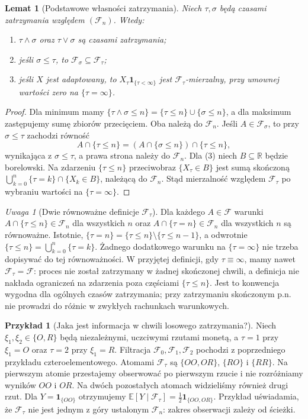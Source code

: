 \documentclass[11pt,a4paper,oneside]{report}
\numberwithin{equation}{chapter}
\theoremstyle{plain}
\newtheorem{lemat}[twierdzenie]{Lemat}
\theoremstyle{definition}
\newtheorem{przyklad}{Przykład}[chapter]
\theoremstyle{remark}
\newtheorem{uwaga}{Uwaga}[chapter]
\newcommand{\R}{\mathbb{R}}
\newcommand{\E}{\mathbb{E}}
\newcommand{\ind}[1]{\mathbf{1}_{#1}}
\begin{document}
\begin{lemat}[Podstawowe własności zatrzymania]
Niech $\tau,\sigma$ będą czasami zatrzymania
względem $(\mathcal F_n)$. Wtedy:
\begin{enumerate}
\item $\tau\wedge\sigma$ oraz $\tau\vee\sigma$ są czasami zatrzymania;
\item jeśli $\sigma\leq\tau$, to $\mathcal F_\sigma\subseteq\mathcal F_\tau$;
\item jeśli $X$ jest adaptowany, to $X_\tau\ind{\{\tau<\infty\}}$
  jest $\mathcal F_\tau$-mierzalny, przy umownej wartości zero na $\{\tau=\infty\}$.
\end{enumerate}
\end{lemat}
\begin{proof}
Dla minimum mamy
$\{\tau\wedge\sigma\leq n\}=
\{\tau\leq n\}\cup\{\sigma\leq n\}$,
a dla maksimum zastępujemy sumę zbiorów
przecięciem. Oba należą do $\mathcal F_n$.
Jeśli $A\in\mathcal F_\sigma$, to przy
$\sigma\leq\tau$ zachodzi równość
\[
A\cap\{\tau\leq n\}
=(A\cap\{\sigma\leq n\})\cap\{\tau\leq n\},
\]
wynikająca z $\sigma\leq\tau$, a prawa strona
należy do $\mathcal F_n$.
Dla (3) niech $B\subseteq\R$ będzie borelowski.
Na zdarzeniu $\{\tau\leq n\}$ przeciwobraz
$\{X_\tau\in B\}$ jest sumą skończoną
$\bigcup_{k=0}^n\{\tau=k\}\cap\{X_k\in B\}$,
należącą do $\mathcal F_n$. Stąd mierzalność
względem $\mathcal F_\tau$ po wybraniu
wartości na $\{\tau=\infty\}$.
\end{proof}

\begin{uwaga}[Dwie równoważne definicje $\mathcal F_\tau$]
Dla każdego $A\in\mathcal F$ warunki
$A\cap\{\tau\leq n\}\in\mathcal F_n$ dla wszystkich $n$
oraz $A\cap\{\tau=n\}\in\mathcal F_n$ dla wszystkich $n$
są równoważne. Istotnie, $\{\tau=n\}=\{\tau\leq n\}
\setminus\{\tau\leq n-1\}$, a odwrotnie
$\{\tau\leq n\}=\bigcup_{k=0}^n\{\tau=k\}$.
Żadnego dodatkowego warunku na $\{\tau=\infty\}$
nie trzeba dopisywać do tej równoważności.
W przyjętej definicji, gdy $\tau\equiv\infty$,
mamy nawet $\mathcal F_\tau=\mathcal F$:
proces nie został zatrzymany w żadnej skończonej chwili,
a definicja nie nakłada ograniczeń na zdarzenia
poza częściami $\{\tau\leq n\}$. Jest to konwencja
wygodna dla ogólnych czasów zatrzymania;
przy zatrzymaniu skończonym p.n. nie prowadzi do
różnic w zwykłych rachunkach warunkowych.
\end{uwaga}


\begin{przyklad}[Jaka jest informacja w chwili losowego zatrzymania?]
Niech $\xi_1,\xi_2\in\{O,R\}$ będą niezależnymi,
uczciwymi rzutami monetą, a
$\tau=1$ przy $\xi_1=O$ oraz $\tau=2$ przy $\xi_1=R$.
Filtracja $\mathcal F_0,\mathcal F_1,\mathcal F_2$
pochodzi z poprzedniego przykładu czteroelementowego.
Atomami $\mathcal F_\tau$ są
$\{OO,OR\}$, $\{RO\}$ i $\{RR\}$.
Na pierwszym atomie przestajemy obserwować po
pierwszym rzucie i nie rozróżniamy wyników
$OO$ i $OR$. Na dwóch pozostałych atomach
widzieliśmy również drugi rzut.
Dla $Y=\ind{\{OO\}}$ otrzymujemy
$\E[Y\mid\mathcal F_\tau]
=\frac12\ind{\{OO,OR\}}$.
Przykład uświadamia, że $\mathcal F_\tau$ nie jest
jednym z góry ustalonym $\mathcal F_n$:
zakres obserwacji zależy od ścieżki.
\end{przyklad}
\end{document}
